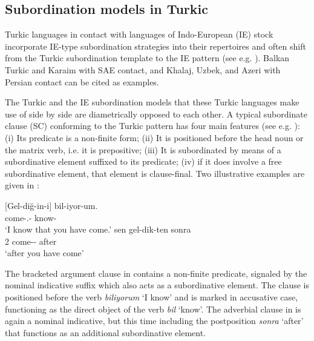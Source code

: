 \documentclass[output=paper,colorlinks,citecolor=brown]{langscibook}
\begin{document}
\subsection{Subordination models in Turkic}
\label{sec:keskin:sub_turkic}

Turkic languages in contact with languages of Indo-European (IE) stock incorporate IE-type subordination strategies into their repertoires and often shift from the Turkic subordination template to the IE pattern (see e.g. \citealt[55.2.6, 55.3.8, 903--904, 913--916, 923--924]{Johanson.2021}). Balkan Turkic and Karaim with SAE contact, and Khalaj, Uzbek, and Azeri with Persian contact can be cited as examples.

The Turkic and the IE subordination models that these Turkic languages make use of side by side are diametrically opposed to each other. A typical subordinate clause (SC) conforming to the Turkic pattern has four main features (see e.g. \cites[223--224, 229--233]{Csato.Johanson.1998}[48, 57--66]{Johanson.1998}[854--931]{Johanson.2021}): (i) Its predicate is a non-finite form; (ii) It is positioned before the head noun or the matrix verb, i.e. it is prepositive; (iii) It is subordinated by means of a subordinative element suffixed to its predicate; (iv) if it does involve a free subordinative element, that element is clause-final. Two illustrative examples are given in : 

\ea\label{ex:keskin:Turkic_tmpl}
  \ea\label{ex:keskin:Turkic_nfin1}
\gll $[$Gel-diğ-in-i$]$ bil-iyor-um.\\
\hphantom{[}come-\Sg.\Poss-\Acc{} know-\Sg\\
\glt `I know that you have come.'
  \ex\label{ex:keskin:Turkic_nfin2}
\gll sen gel-dik-ten sonra\\
2\Sg{} come-\Nind-\Abl{} after\\
\glt `after you have come'
  \z
\z

\noindent
The bracketed argument clause in  contains a non-finite predicate, signaled by the nominal indicative suffix which also acts as a subordinative element. The clause is positioned before the verb \textit{biliyorum} `I know' and is marked in accusative case, functioning as the direct object of the verb \textit{bil} `know'. The adverbial clause in  is again a nominal indicative, but this time including the postposition \textit{sonra} `after' that functions as an additional subordinative element. 
\end{document}
